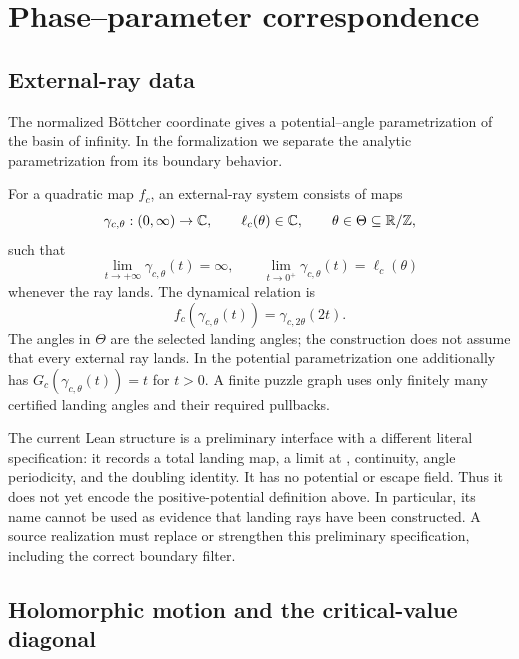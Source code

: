 \chapter{Phase--parameter correspondence}
\label{ch:phase-parameter}
\label{chap:phase-parameter}

\section{External-ray data}

The normalized Böttcher coordinate gives a potential--angle
parametrization of the basin of infinity.  In the formalization we separate
the analytic parametrization from its boundary behavior.

\begin{definition}
\label{def:external-ray-system}
For a quadratic map $f_c$, an external-ray system consists of maps
\[
 \gamma_{c,\theta}:(0,\infty)\to\mathbb C,\qquad
  \ell_c(\theta)\in\mathbb C,\qquad\theta\in\Theta\subseteq\mathbb R/\mathbb Z,
\]
such that
\[
 \lim_{t\to+\infty}\gamma_{c,\theta}(t)=\infty,\qquad
 \lim_{t\to0^+}\gamma_{c,\theta}(t)=\ell_c(\theta)
\]
whenever the ray lands.  The dynamical relation is
\[
 f_c(\gamma_{c,\theta}(t))
 =\gamma_{c,2\theta}(2t).
\]
The angles in $\Theta$ are the selected landing angles; the construction
does not assume that every external ray lands.  In the potential
parametrization one additionally has
$G_c(\gamma_{c,\theta}(t))=t$ for $t>0$.  A finite puzzle graph uses
only finitely many certified landing angles and their required pullbacks.
\end{definition}

\begin{remark}
The current Lean structure  is a preliminary
interface with a different literal specification: it records a total
landing map, a limit at , continuity, angle periodicity,
and the doubling identity.  It has no potential or escape field.
Thus it does not yet encode the positive-potential definition above.
In particular, its name cannot be used as evidence that landing rays
have been constructed.  A source realization must replace or strengthen
this preliminary specification, including the correct boundary filter.
\end{remark}

\section{Holomorphic motion and the critical-value diagonal}


